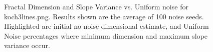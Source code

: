 \documentclass[12pt, oneside]{book}
\begin{document}
\begin{figure}[!b]
  \centering
  \caption[Fractal Dimension and Slope Variance vs. Uniform noise for koch3lines]{Fractal Dimension and Slope Variance vs. Uniform noise for koch3lines.png.  Results shown are the average of 100 noise seeds.  Highlighted are initial no-noise dimensional estimate, and Uniform Noise percentages where minimum dimension and maximum slope variance occur.}
  \label{fig:koch3lines_uniform_result}
\end{figure}
\end{document}
